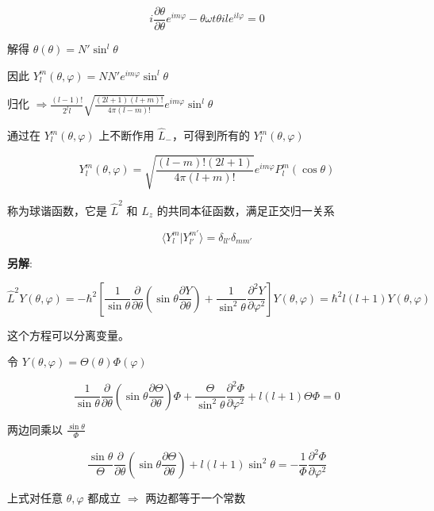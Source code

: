 \documentclass[lang=cn,10pt]{elegantbook}
\begin{document}
\begin{equation}
	i\frac{\partial \theta}{\partial \theta} e^{im\varphi} - \theta \omega t \theta i l e^{il\varphi} = 0
\end{equation}

解得 $\theta(\theta) = N' \sin^l \theta$

因此 $Y_{l}^{m}(\theta, \varphi) = N N' e^{im\varphi} \sin^l \theta$

归化 $\Rightarrow \frac{(l-1)!}{2^l l} \sqrt{\frac{(2l+1)(l+m)!}{4\pi (l-m)!}} e^{im\varphi} \sin^l \theta$

通过在 $Y_{l}^{m}(\theta, \varphi)$ 上不断作用 $\hat{L}_-$，可得到所有的 $Y_{l}^{m}(\theta, \varphi)$

\begin{equation}
	Y_{l}^{m}(\theta, \varphi) = \sqrt{\frac{(l-m)!(2l+1)}{4\pi (l+m)!}} e^{im\varphi} P_{l}^{m}(\cos \theta)
\end{equation}

称为球谐函数，它是 $\hat{L}^2$ 和 $\hat{L}_z$ 的共同本征函数，满足正交归一关系

\begin{equation}
	\langle Y_{l}^{m} | Y_{l'}^{m'} \rangle = \delta_{ll'} \delta_{mm'}
\end{equation}


\textbf{另解}:

\[
\hat{L}^2 Y(\theta, \varphi) = -\hbar^2 \left[ \frac{1}{\sin\theta} \frac{\partial}{\partial \theta} \left( \sin\theta \frac{\partial Y}{\partial \theta} \right) + \frac{1}{\sin^2\theta} \frac{\partial^2 Y}{\partial \varphi^2} \right] Y(\theta, \varphi) = \hbar^2 l(l+1) Y(\theta, \varphi)
\]

这个方程可以分离变量。

令 $Y(\theta, \varphi) = \Theta(\theta) \Phi(\varphi)$

\[
\frac{1}{\sin\theta} \frac{\partial}{\partial \theta} \left( \sin\theta \frac{\partial \Theta}{\partial \theta} \right) \Phi + \frac{\Theta}{\sin^2\theta} \frac{\partial^2 \Phi}{\partial \varphi^2} + l(l+1) \Theta \Phi = 0
\]

两边同乘以 $\frac{\sin\theta}{\Phi}$

\[
\frac{\sin\theta}{\Theta} \frac{\partial}{\partial \theta} \left( \sin\theta \frac{\partial \Theta}{\partial \theta} \right) + l(l+1) \sin^2\theta = -\frac{1}{\Phi} \frac{\partial^2 \Phi}{\partial \varphi^2}
\]

上式对任意 $\theta, \varphi$ 都成立 $\Rightarrow$ 两边都等于一个常数
\end{document}
